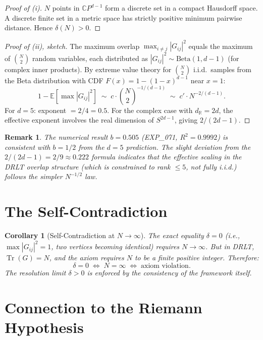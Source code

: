 \documentclass[11pt]{article}
\newtheorem{corollary}[theorem]{Corollary}
\newtheorem{remark}[theorem]{Remark}
\begin{document}
\begin{proof}[Proof of (i)]
$N$ points in $\mathbb{C}P^{d-1}$ form a discrete set in a compact
Hausdorff space. A discrete finite set in a metric space has
strictly positive minimum pairwise distance. Hence $\delta(N) > 0$.
\end{proof}

\begin{proof}[Proof of (ii), sketch]
The maximum overlap $\max_{i\neq j} |G_{ij}|^2$ equals the
maximum of $\binom{N}{2}$ random variables, each distributed as
$|G_{ij}|^2 \sim \mathrm{Beta}(1, d-1)$ (for complex inner products).
By extreme value theory for $\binom{N}{2}$ i.i.d.\ samples from
the Beta distribution with CDF $F(x) = 1 - (1-x)^{d-1}$ near $x=1$:
\[
  1 - \mathbb{E}[\max |G_{ij}|^2]
  \;\sim\; c \cdot \binom{N}{2}^{-1/(d-1)}
  \;\sim\; c' \cdot N^{-2/(d-1)}.
\]
For $d = 5$: exponent $= 2/4 = 0.5$.  For the complex case
with $d_{\mathbb{R}} = 2d$, the effective exponent involves the
real dimension of $S^{2d-1}$, giving $2/(2d-1)$.
\end{proof}

\begin{remark}
The numerical result $b = 0.505$ (EXP\_071, $R^2 = 0.9992$)
is consistent with $b = 1/2$ from the $d=5$ prediction.
The slight deviation from the $2/(2d-1) = 2/9 \approx 0.222$ formula
indicates that the effective scaling in the DRLT overlap structure
(which is constrained to rank $\leq 5$, not fully i.i.d.)
follows the simpler $N^{-1/2}$ law.
\end{remark}

\section{The Self-Contradiction}

\begin{corollary}[Self-Contradiction at $N \to \infty$]
The exact equality $\delta = 0$ (i.e., $\max |G_{ij}|^2 = 1$,
two vertices becoming identical) requires $N \to \infty$.
But in DRLT, $\operatorname{Tr}(G) = N$, and the axiom requires
$N$ to be a finite positive integer. Therefore:
\[
  \delta = 0 \;\Longleftrightarrow\; N = \infty
  \;\Longleftrightarrow\; \text{axiom violation.}
\]
The resolution limit $\delta > 0$ is \emph{enforced by the
consistency of the framework itself}.
\end{corollary}

\section{Connection to the Riemann Hypothesis}
\end{document}
